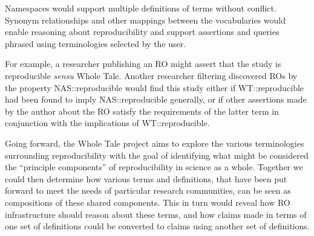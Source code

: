 Namespaces would support multiple definitions of terms without conflict.
Synonym relationships and other mappings between the vocabularies would enable reasoning about reproducibility
	 and support assertions and queries phrased using terminologies selected by the user.

         For example, a researcher publishing an RO might assert that the study is reproducible \emph{sensu} \textsf{Whole Tale}.  Another researcher filtering discovered ROs by the property \textsf{NAS::reproducible} would find this study
         either if \textsf{WT::reproducible} had been found to imply \textsf{NAS::reproducible} generally, or if other assertions made by the author
         about the RO satisfy the requirements of the latter term in conjunction with the implications of \textsf{WT::reproducible}.

         Going forward, the Whole Tale project aims to explore the various terminologies surrounding reproducibility with the goal of identifying what might be considered the ``principle components'' of reproducibility in science as a whole.  Together we could then determine how various terms and definitions,
that have been put forward to meet the needs of particular research communities, can be seen as compositions of these shared components.  
This in turn would reveal how RO infrastructure should reason about these terms, 
	and how claims made in terms of one set of definitions could be converted to claims using another set of definitions.


